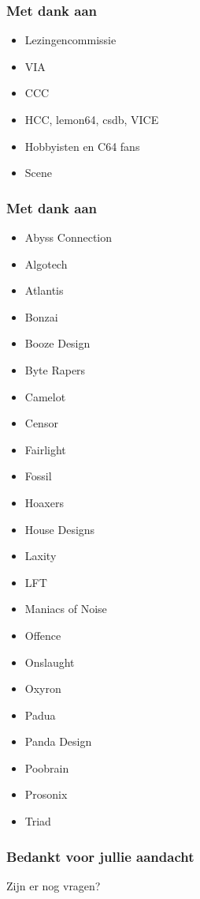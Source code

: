 \documentclass[aspectratio=43]{uva-inf-presentation}
\begin{document}

\begin{frame}
\frametitle{Met dank aan}

\begin{itemize}
\item Lezingencommissie
\item VIA
\item CCC
\item HCC, lemon64, csdb, VICE
\item Hobbyisten en C64 fans
\item Scene
\end{itemize}

\end{frame}


\begin{frame}
\frametitle{Met dank aan}

\begin{multicols}{3}
\begin{itemize}
\item Abyss Connection
\item Algotech
\item Atlantis
\item Bonzai
\item Booze Design
\item Byte Rapers
\item Camelot
\item Censor
\item Fairlight
\item Fossil
\item Hoaxers
\item House Designs
\item Laxity
\item LFT
\item Maniacs of Noise
\item Offence
\item Onslaught
\item Oxyron
\item Padua
\item Panda Design
\item Poobrain
\item Prosonix
\item Triad
\end{itemize}
\end{multicols}

\end{frame}


\begin{frame}
\frametitle{Bedankt voor jullie aandacht}
\Large{\centerline{Zijn er nog vragen?}}
\end{frame}
\end{document}
